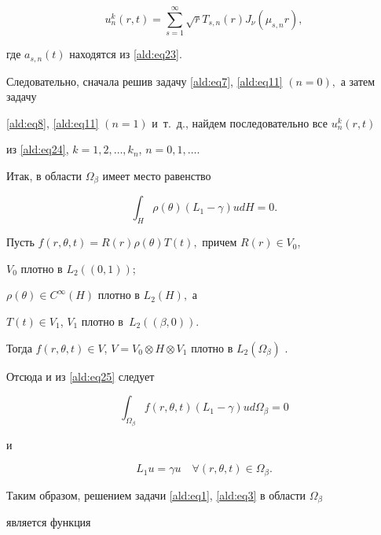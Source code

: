 \begin{equation}

u_{n}^k(r,t)=\sum\limits_{s=1}^{\infty} \sqrt{r} T_{s,n}(r) J_{\nu}(\mu_{s,n} r),

\label{ald:eq24}

\end{equation}

где $a_{s,n}(t)$ находятся из \eqref{ald:eq23}. 

Следовательно, сначала решив задачу \eqref{ald:eq7}, \eqref{ald:eq11} $(n=0),$ а затем задачу

\eqref{ald:eq8}, \eqref{ald:eq11} $(n=1)$ и~т.~д., найдем последовательно все $u_n^k (r,t)$

из \eqref{ald:eq24}, $k =1,2,\dots, k_{n}$, $n = 0, 1,\dots.$



Итак, в области $\Omega_\beta$ имеет место равенство

\begin{equation}

\int_{H}\rho(\theta)(L_1-\gamma)udH=0. 

\label{ald:eq25}

\end{equation}



Пусть $f(r,\theta,t)=R(r)\rho(\theta)T(t),$ причем $R(r)\in V_0$,

$V_0 $ плотно в $L_2((0,1))$; 

$\rho(\theta)\in C^{\infty}(H)$  плотно в $L_2(H),$ а 

$T(t)\in V_1$, $V_1$ плотно в~$L_2((\beta,0)).$ 

Тогда $f(r,\theta, t)\in V$, $V=V_0\otimes H \otimes V_1$ плотно в $L_2(\Omega_\beta)$  \cite{aldash:9}.



Отсюда и из \eqref{ald:eq25} следует

$$

\int_{\Omega_\beta}f(r,\theta,t)(L_1-\gamma)ud \Omega_\beta =0

$$

и

$$

L_1 u= \gamma u \quad  \forall(r,\theta,t)\in \Omega_\beta.

$$



Таким образом, решением задачи \eqref{ald:eq1}, \eqref{ald:eq3} в области $\Omega_\beta$

является функция

